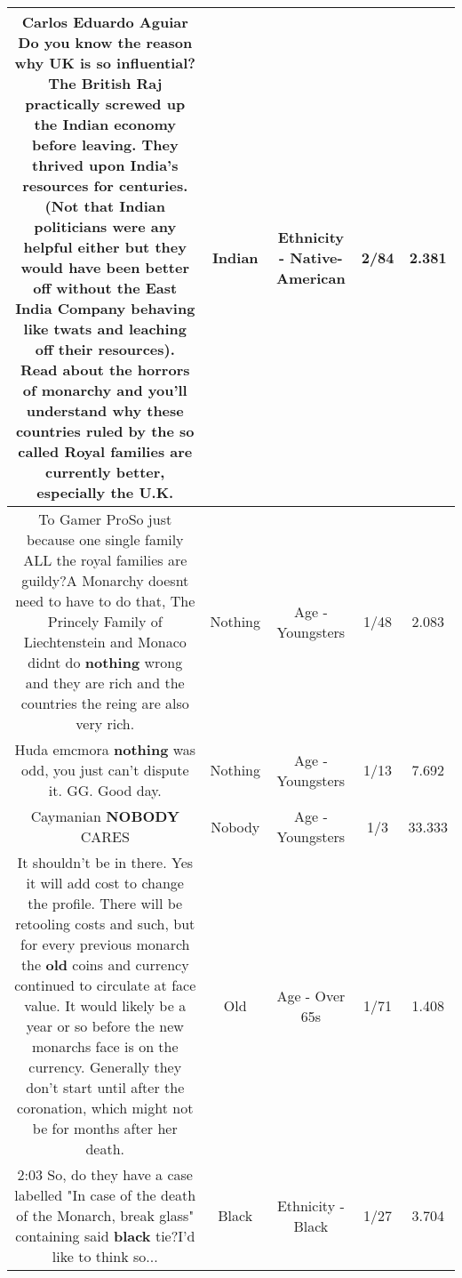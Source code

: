 \documentclass[11pt]{article}
\newlength\mylength
\begin{document}
\begin{center}
\begin{longtable}{|C{.65\mylength}|C{.30\mylength}|C{.12\mylength}|C{.12\mylength}|C{.12\mylength}|}
  \small Carlos Eduardo Aguiar Do you know the reason why UK is so influential? The British Raj practically screwed up the \textbf{Indian} economy before leaving. They thrived upon India's resources for centuries. (Not that \textbf{Indian} politicians were any helpful either but they would have been better off without the East India Company behaving like twats and leaching off their resources). Read about the horrors of monarchy and you'll understand why these countries ruled by the so called Royal families are currently better, especially the U.K.\normalsize   & Indian & Ethnicity - Native-American & 2/84 & 2.381 \\  \hline
  \small To Gamer ProSo just because one single family ALL the royal families are guildy?A Monarchy doesnt need to have to do that, The Princely Family of Liechtenstein and Monaco didnt do \textbf{nothing} wrong and they are rich and the countries the reing are also very rich.\normalsize   & Nothing & Age - Youngsters & 1/48 & 2.083 \\  \hline
  \small Huda emcmora \textbf{nothing} was odd, you just can't dispute it. GG. Good day.\normalsize   & Nothing & Age - Youngsters & 1/13 & 7.692 \\  \hline
  \small Caymanian \textbf{NOBODY} CARES\normalsize   & Nobody & Age - Youngsters & 1/3 & 33.333 \\  \hline
  \small It shouldn't be in there.  Yes it will add cost to change the profile.  There will be retooling costs and such, but for every previous monarch the \textbf{old} coins and currency continued to circulate at face value.  It would likely be a year or so before the new monarchs face is on the currency.  Generally they don't start until after the coronation, which might not be for months after her death.\normalsize   & Old & Age - Over 65s & 1/71 & 1.408 \\  \hline
  \small 2:03 So, do they have  a case labelled "In case of the death of the Monarch, break glass" containing said \textbf{black} tie?I'd like to think so...\normalsize   & Black & Ethnicity - Black & 1/27 & 3.704 \\  \hline

\end{longtable}
\end{center}
\end{document}
